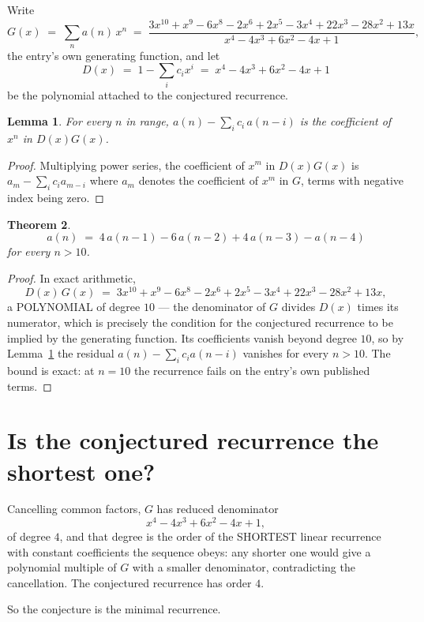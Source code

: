 \documentclass[11pt,a4paper]{article}
\theoremstyle{plain}
\newtheorem{theorem}{Theorem}
\newtheorem{lemma}[theorem]{Lemma}
\theoremstyle{definition}
\begin{document}
Write
\[
G(x)\;=\;\sum_{n}a(n)\,x^{n}\;=\;\frac{3 x^{10} + x^{9} - 6 x^{8} - 2 x^{6} + 2 x^{5} - 3 x^{4} + 22 x^{3} - 28 x^{2} + 13 x}{x^{4} - 4 x^{3} + 6 x^{2} - 4 x + 1},
\]
the entry's own generating function, and let
\[
D(x)\;=\;1-\sum_i c_i x^{i}\;=\;x^{4} - 4 x^{3} + 6 x^{2} - 4 x + 1
\]
be the polynomial attached to the conjectured recurrence.

\begin{lemma}\label{lem:key}
For every $n$ in range, $a(n)-\sum_i c_i\,a(n-i)$ is the coefficient of $x^{n}$ in
$D(x)G(x)$.
\end{lemma}

\begin{proof}
Multiplying power series, the coefficient of $x^{m}$ in $D(x)G(x)$ is
$a_m-\sum_i c_i a_{m-i}$ where $a_m$ denotes the coefficient of $x^{m}$ in $G$, terms with
negative index being zero.
\end{proof}

\begin{theorem}
\[
a(n)\;=\;4\,a(n-1) - 6\,a(n-2) + 4\,a(n-3) - a(n-4)
\]
for every $n>10$.
\end{theorem}

\begin{proof}
In exact arithmetic,
\[
D(x)\,G(x)\;=\;3 x^{10} + x^{9} - 6 x^{8} - 2 x^{6} + 2 x^{5} - 3 x^{4} + 22 x^{3} - 28 x^{2} + 13 x,
\]
a POLYNOMIAL of degree $10$ --- the denominator of $G$ divides $D(x)$ times its numerator,
which is precisely the condition for the conjectured recurrence to be implied by the
generating function. Its coefficients vanish beyond degree $10$, so by
Lemma~\ref{lem:key} the residual $a(n)-\sum_ic_ia(n-i)$ vanishes for every
$n>10$. The bound is exact: at $n=10$ the recurrence fails on the entry's own published terms.
\end{proof}

\section{Is the conjectured recurrence the shortest one?}

Cancelling common factors, $G$ has reduced denominator
\[
x^{4} - 4 x^{3} + 6 x^{2} - 4 x + 1,
\]
of degree $4$, and that degree is the order of the SHORTEST linear recurrence with
constant coefficients the sequence obeys: any shorter one would give a polynomial multiple of
$G$ with a smaller denominator, contradicting the cancellation. The conjectured recurrence has
order $4$.

So the conjecture is the minimal recurrence.
\end{document}
